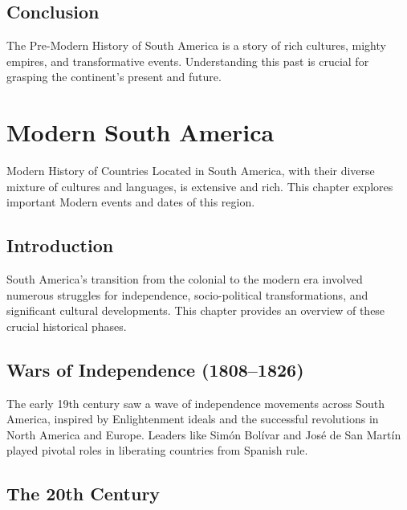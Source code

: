 \documentclass[a4paper,12pt]{book}
\begin{document}
\section{Conclusion}
\label{sec:conclusion-pre-modern-south-america}
The Pre-Modern History of South America is a story of rich cultures, mighty empires, and transformative events. Understanding this past is crucial for grasping the continent’s present and future.

\chapter{Modern South America}
\label{ch:modern-history-south-america}

Modern History of Countries Located in South America, with their diverse mixture of cultures and languages, is extensive and rich. This chapter explores important Modern events and dates of this region.

\section{Introduction}
\label{sec:introduction-modern-south-america}
South America's transition from the colonial to the modern era involved numerous struggles for independence, socio-political transformations, and significant cultural developments. This chapter provides an overview of these crucial historical phases.

\section{Wars of Independence (1808–1826)}
\label{sec:wars-of-independence}
The early 19th century saw a wave of independence movements across South America, inspired by Enlightenment ideals and the successful revolutions in North America and Europe. Leaders like Simón Bolívar and José de San Martín played pivotal roles in liberating countries from Spanish rule.

\section{The 20th Century}
\label{sec:20th-century}
\end{document}
